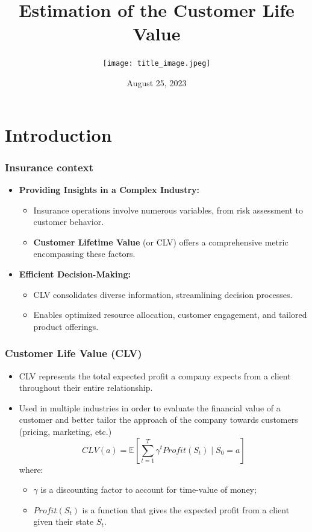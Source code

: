 \documentclass[aspectratio=169,xcolor=x11names,compress]{beamer}
\title{Estimation of the Customer Life Value}
\author{\texttt{[image: title\_image.jpeg]}}
\date{August 25, 2023}
\newcommand{\E}{\mathbb{E}}
\begin{document}
\maketitle


\section{Introduction}

\begin{frame}
\frametitle{Insurance context}

\begin{itemize}
  \item \textbf{Providing Insights in a Complex Industry:}
  \begin{itemize}
    \item Insurance operations involve numerous variables, from risk assessment to customer behavior.
    \item \textbf{Customer Lifetime Value} (or CLV) offers a comprehensive metric encompassing these factors.
  \end{itemize}
  
  \item \textbf{Efficient Decision-Making:}
  \begin{itemize}
    \item CLV consolidates diverse information, streamlining decision processes.
    \item Enables optimized resource allocation, customer engagement, and tailored product offerings.
  \end{itemize}
\end{itemize}

\end{frame}

\begin{frame}
\frametitle{Customer Life Value (CLV)}

\begin{itemize}
    \item CLV represents the total expected profit a
    company expects from a client throughout their entire relationship.
    \item Used in multiple industries in order to evaluate the financial value of a
    customer and better tailor the approach of the company towards
    customers (pricing, marketing, etc.) 
\[
CLV(a) = \E\left[\sum_{t=1}^T \gamma^t Profit(S_t)\mid S_0 = a\right]
\]
where:
\begin{itemize}
    \item $\gamma$ is a discounting factor to account for time-value of money;
    \item $Profit(S_t)$ is a function that gives the expected profit from a client given their state $S_t$.
\end{itemize}

\end{itemize}
\end{frame}
\end{document}
